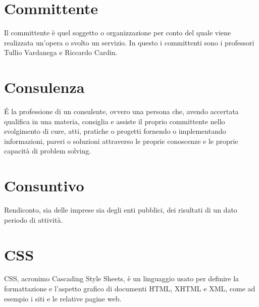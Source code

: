 \section{Committente}\label{sec:Committenti}
Il committente è quel soggetto o organizzazione per conto del quale viene realizzata un'opera o svolto un servizio. In questo  i committenti sono i professori Tullio Vardanega e Riccardo Cardin.

\section{Consulenza}\label{sec:Consulenze}
É la professione di un consulente, ovvero una persona che, avendo accertata qualifica in una materia, consiglia e assiste il proprio committente nello svolgimento di cure, atti, pratiche o progetti fornendo o implementando informazioni, pareri o soluzioni attraverso le proprie conoscenze e le proprie capacità di problem solving.

\section{Consuntivo}\label{sec:Consuntivi}
Rendiconto, sia delle imprese sia degli enti pubblici, dei risultati di un dato periodo di attività.

\section{CSS}\label{sec:Cascading Style Sheets}
CSS, acronimo Cascading Style Sheets, è un linguaggio usato per definire la formattazione e l'aspetto grafico di documenti HTML, XHTML e XML, come ad esempio i siti e le relative pagine web.
